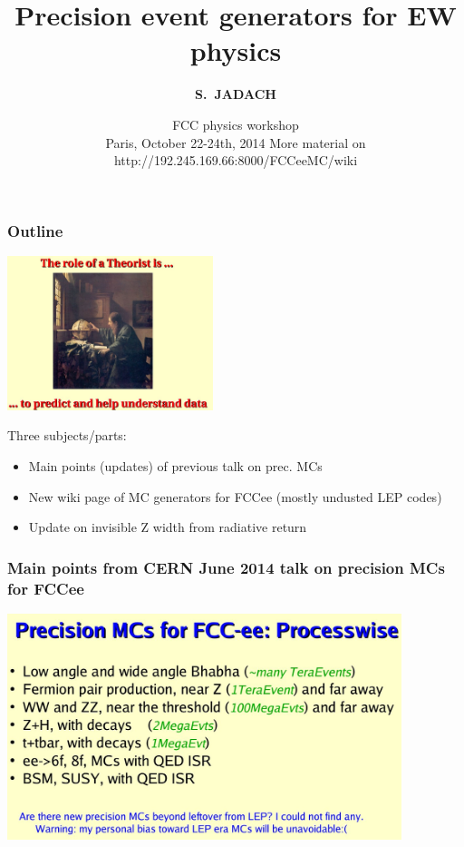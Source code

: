 \documentclass{beamer}
\title[Precision Monte Carlo generators] %
{ {\bf Precision event generators for EW physics}
} %
\author[S.~Jadach] %
{\Large\bf S.~JADACH }
\institute[Universities of Somewhere and Elsewhere] %
{ {\large\crd IFJ-PAN, Krak\'ow, Poland}\\
  {~~~}\\
  {\footnotesize
  Partly supported by Polish Government grant\\
  {\em Narodowe Centrum Nauki} DEC-2011/03/B/ST2/02632
}}
\date[Short Occasion] %
{\small FCC physics workshop\\
   Paris, October 22-24th, 2014
\vskip 4mm
 \footnotesize
  More material on http://192.245.169.66:8000/FCCeeMC/wiki
}
\newcommand{\cbl}{\color{blue}}
\newcommand{\ns}{\normalsize}
\begin{document}
\begin{frame}
  \titlepage
\end{frame}


\begin{frame}[fragile]
\frametitle{\bf Outline}

\includegraphics[width=60mm]{./sli0.jpg}

\vspace{2mm}
\large\cbl
Three subjects/parts:
\begin{itemize}
\item\cbl
 Main points (updates) of previous talk on prec. MCs
\item
 New wiki page of MC generators for FCCee
 (mostly undusted LEP codes)
\item
 Update on invisible Z width from radiative return
\end{itemize}
\end{frame}


\begin{frame}[fragile]
\frametitle{\bf\ns 
 Main points from CERN June 2014 talk on precision MCs for FCCee}

\includegraphics[width=115mm]{./sli2.jpg}
\end{frame}
\end{document}
